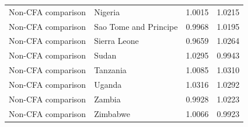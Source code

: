 \begin{table}
\begin{tabular}[t]{llrr}
Non-CFA comparison & Nigeria & 1.0015 & 1.0215\\
Non-CFA comparison & Sao Tome and Principe & 0.9968 & 1.0195\\
Non-CFA comparison & Sierra Leone & 0.9659 & 1.0264\\
\addlinespace
Non-CFA comparison & Sudan & 1.0295 & 0.9943\\
Non-CFA comparison & Tanzania & 1.0085 & 1.0310\\
Non-CFA comparison & Uganda & 1.0316 & 1.0292\\
Non-CFA comparison & Zambia & 0.9928 & 1.0223\\
Non-CFA comparison & Zimbabwe & 1.0066 & 0.9923\\
\bottomrule
\end{tabular}
\end{table}